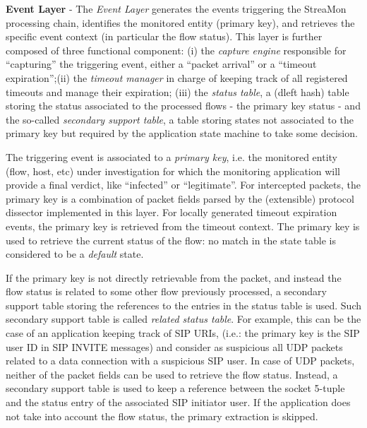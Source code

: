 \documentclass[conference,letterpaper]{sig-alternate-10pt}
\begin{document}
\textbf{Event Layer} - The \emph{Event Layer} generates the events triggering the StreaMon processing chain, identifies the monitored entity (primary key), and retrieves the specific event context (in particular the flow status). This layer is further composed of three functional component: (i) the \textit{capture engine} responsible for ``capturing'' the triggering event, either a ``packet arrival'' or a ``timeout expiration'';(ii) the \textit{timeout manager} in charge of keeping track of all registered timeouts and manage their expiration; (iii) the \textit{status table}, a (dleft hash) table storing the status associated to the processed flows - the primary key status - and the so-called \textit{secondary support table}, a table storing states not associated to the primary key but required by the application state machine to take some decision. 

The triggering event is associated to a \textit{primary key}, i.e. the monitored entity (flow, host, etc) under investigation for which the monitoring application will provide a final verdict, like ``infected'' or ``legitimate''. For intercepted packets, the primary key is a combination of packet fields parsed by the (extensible) protocol dissector implemented in this layer. For locally generated timeout expiration events, the primary key is retrieved from the timeout context. The primary key is used to retrieve the current status of the flow: no match in the state table is considered to be a \emph{default} state.  

If the primary key is not directly retrievable from the packet, and instead the flow status is related to some other flow previously processed, a secondary support table storing the references to the entries in the status table is used. Such secondary support table is called \emph{related status table}. For example, this can be the case of an application keeping track of SIP URIs, (i.e.: the primary key is the SIP user ID in SIP INVITE messages) and consider as suspicious all UDP packets related to a data connection with a suspicious SIP user. In case of UDP packets, neither of the packet fields can be used to retrieve the flow status. Instead, a secondary support table is used to keep a reference between the socket 5-tuple and the status entry of the associated SIP initiator user. If the application does not take into account the flow status, the primary extraction is skipped.
\end{document}

